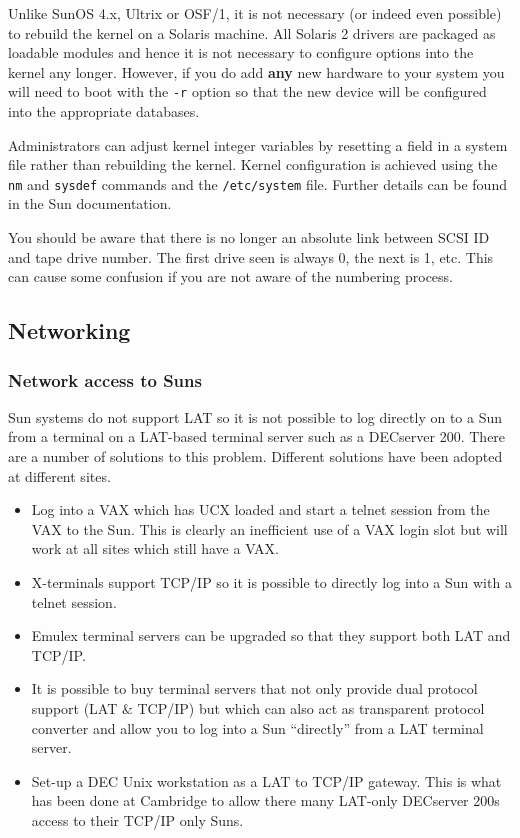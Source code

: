 Unlike SunOS 4.x, Ultrix or OSF/1, it is not necessary (or indeed even
possible) to rebuild the kernel on a Solaris machine. All Solaris 2
drivers are packaged as loadable modules and hence it is not necessary to
configure options into the kernel any longer. However, if you do add {\bf any}
new hardware to your system you will need to boot with the \verb+-r+ option
so that the new device will be configured into the appropriate databases.

Administrators can adjust kernel
integer variables by resetting a field in a system file rather than
rebuilding the kernel. Kernel configuration is achieved using the
\verb+nm+ and \verb+sysdef+ commands and the \verb+/etc/system+ file.
Further details can be found in the Sun documentation.

You should be aware that there is no longer an absolute link between
SCSI ID and tape drive number. The first drive seen is always 0, the next
is 1, etc. This can cause some confusion if you are not aware of the
numbering process.

\subsection{Networking}

\subsubsection{Network access to Suns}

Sun systems do not support LAT so it is not possible to log directly on to
a Sun from a terminal on a LAT-based terminal server such as a DECserver 200.
There are a number of solutions to this problem. Different solutions
have been adopted at different sites.

\begin{itemize}

\item Log into a VAX which has UCX loaded and start a telnet session
from the VAX to the Sun. This is clearly an inefficient use of a VAX
login slot but will work at all sites which still have a VAX.

\item X-terminals support TCP/IP so it is possible to directly log into a Sun
with a telnet session.

\item Emulex terminal servers can be upgraded so that they support both LAT
and TCP/IP.

\item It is possible to buy terminal servers that not only provide dual
protocol support (LAT \& TCP/IP) but which can also act as transparent
protocol converter and allow you to log into a Sun ``directly'' from
a LAT terminal server.

\item Set-up a DEC Unix workstation as a LAT to TCP/IP gateway. This is what
has been done at Cambridge to allow there many LAT-only DECserver 200s
access to their TCP/IP only Suns.

\end{itemize}

